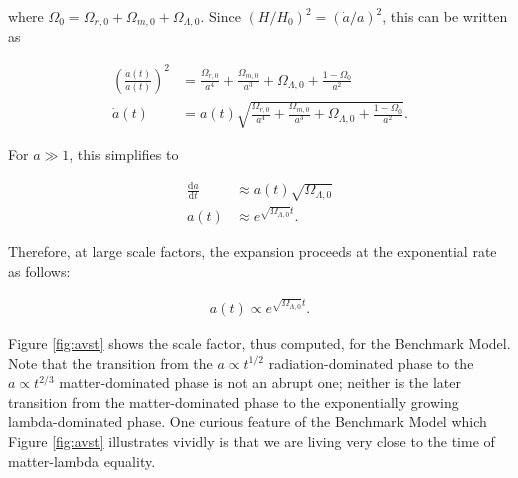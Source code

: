 \documentclass[a4paper,11pt]{article}
\begin{document}
{\noindent}where $\Omega_0=\Omega_{r,0}+\Omega_{m,0}+\Omega_{\Lambda,0}$. Since $(H/H_0)^2=(\dot{a}/a)^2$, this can be written as

\begin{align*}
    \left(\frac{\dot{a}(t)}{a(t)}\right)^2 &= \frac{\Omega_{r,0}}{a^4} + \frac{\Omega_{m,0}}{a^3} + \Omega_{\Lambda,0} + \frac{1-\Omega_0}{a^2} \\
    \dot{a}(t) &= a(t)\sqrt{\frac{\Omega_{r,0}}{a^4} + \frac{\Omega_{m,0}}{a^3} + \Omega_{\Lambda,0} + \frac{1-\Omega_0}{a^2}}.
\end{align*}

{\noindent}For $a\gg1$, this simplifies to

\begin{align*}
    \frac{\mathrm{d}a}{\mathrm{d}t} &\approx a(t)\sqrt{\Omega_{\Lambda,0}} \\
    a(t) &\approx e^{\sqrt{\Omega_{\Lambda,0}}t}.
\end{align*}

{\noindent}Therefore, at large scale factors, the expansion proceeds at the exponential rate as follows:

\begin{align*}
    a(t) \propto e^{\sqrt{\Omega_{\Lambda,0}}t}.
\end{align*}

{\noindent}Figure \ref{fig:avst} shows the scale factor, thus computed, for the Benchmark Model. Note that the transition from the $a\propto t^{1/2}$ radiation-dominated phase to the $a\propto t^{2/3}$ matter-dominated phase is not an abrupt one; neither is the later transition from the matter-dominated phase to the exponentially growing lambda-dominated phase. One curious feature of the Benchmark Model which Figure \ref{fig:avst} illustrates vividly is that we are living very close to the time of matter-lambda equality.
\end{document}
